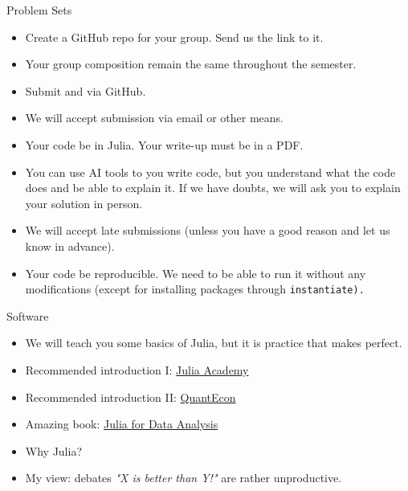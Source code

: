 \documentclass[11pt,xcolor={dvipsnames},aspectratio=159,hyperref={pdftex,pdfpagemode=UseNone,hidelinks,pdfdisplaydoctitle=true},usepdftitle=false]{beamer}
\begin{document}
\begin{frame}{Problem Sets}
    \begin{itemize}
    \item Create a GitHub repo for your group. Send us the link to it.
    \item Your group composition  remain the same throughout the semester.
    \item Submit  and  via GitHub. 
    \item We will  accept submission via email or other means.
    \item Your code  be in Julia. Your write-up must be in a PDF.  
    \item You can use AI tools to  you write code, but you  understand what the code does and be able to explain it. If we have doubts, we will ask you to explain your solution in person. 
    \item We will  accept late submissions (unless you have a good reason and let us know in advance).
    \item Your code  be reproducible. We need to be able to run it without any modifications (except for installing packages through \tt{instantiate}).
    \end{itemize}
\end{frame}


\begin{frame}{Software}
    \begin{itemize}
    \item We will teach you some basics of Julia, but it is practice that makes perfect.
    \item Recommended introduction I: \href{https://juliaacademy.com/p/intro-to-julia}{Julia Academy}
    \item Recommended introduction II: \href{https://julia.quantecon.org/}{QuantEcon}
    \item Amazing book: \href{https://www.manning.com/books/julia-for-data-analysis?utm_source=bkamins&utm_medium=affiliate&utm_campaign=book_kaminski2_julia_3_17_22}{Julia for Data Analysis}
    \item Why Julia? 
    \item My view: debates \emph{"X is better than Y!"} are rather unproductive.
    \end{itemize}   
\end{frame}
\end{document}
